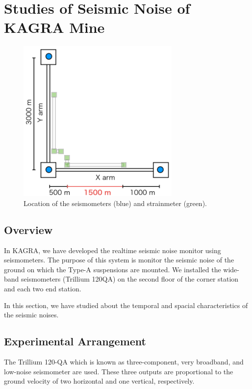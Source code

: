 \section{Studies of Seismic Noise of KAGRA Mine} \label{sec:33}
\begin{figure}[h]
  \begin{center}   
    \includegraphics[width=8cm]{./img_chap3/img328a.png}
    \caption{Location of the seismometers (blue) and strainmeter (green).}\label{img:img328a}
  \end{center}
\end{figure}

\subsection{Overview}
In KAGRA, we have developed the realtime seismic noise monitor using seismometers. The purpose of this system is monitor the seismic noise of the ground on which the Type-A suspensions are mounted. We installed the wide-band seismometers (Trillium 120QA) on the second floor of the corner station and each two end station. 

In this section, we have studied about the temporal and spacial characteristics of the seismic noises.

\subsection{Experimental Arrangement}\label{sec:331}
The Trillium 120-QA which is known as three-component, very broadband, and low-noise seismometer are used. These three outputs are proportional to the ground velocity of two horizontal and one vertical, respectively. 

